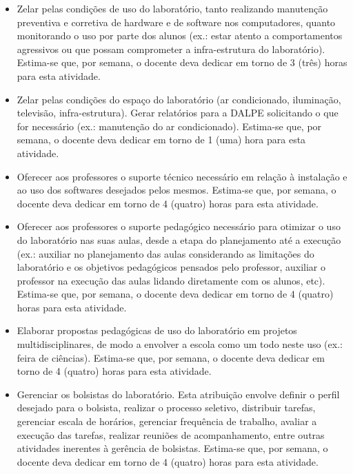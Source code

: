 \begin{itemize}
\item Zelar pelas condições de uso do laboratório, tanto realizando manutenção preventiva e corretiva de hardware e de software nos computadores, quanto monitorando o uso por parte dos alunos (ex.: estar atento a comportamentos agressivos ou que possam comprometer a infra-estrutura do laboratório). Estima-se que, por semana, o docente deva dedicar em torno de 3 (três) horas para esta atividade.

\item Zelar pelas condições do espaço do laboratório (ar condicionado, iluminação, televisão, infra-estrutura). Gerar relatórios para a DALPE solicitando o que for necessário (ex.: manutenção do ar condicionado). Estima-se que, por semana, o docente deva dedicar em torno de 1 (uma) hora para esta atividade.

\item Oferecer aos professores o suporte técnico necessário em relação à instalação e ao uso dos softwares desejados pelos mesmos. Estima-se que, por semana, o docente deva dedicar em torno de 4 (quatro) horas para esta atividade.

\item Oferecer aos professores o suporte pedagógico necessário para otimizar o uso do laboratório nas suas aulas, desde a etapa do planejamento até a execução (ex.: auxiliar no planejamento das aulas considerando as limitações do laboratório e os objetivos pedagógicos pensados pelo professor, auxiliar o professor na execução das aulas lidando diretamente com os alunos, etc). Estima-se que, por semana, o docente deva dedicar em torno de 4 (quatro) horas para esta atividade.

\item Elaborar propostas pedagógicas de uso do laboratório em projetos multidisciplinares, de modo a envolver a escola como um todo neste uso (ex.: feira de ciências). Estima-se que, por semana, o docente deva dedicar em torno de 4 (quatro) horas para esta atividade.

\item Gerenciar os bolsistas do laboratório. Esta atribuição envolve definir o perfil desejado para o bolsista, realizar o processo seletivo, distribuir tarefas, gerenciar escala de horários, gerenciar frequência de trabalho, avaliar a execução das tarefas, realizar reuniões de acompanhamento, entre outras atividades inerentes à gerência de bolsistas. Estima-se que, por semana, o docente deva dedicar em torno de 4 (quatro) horas para esta atividade.
\end{itemize}

